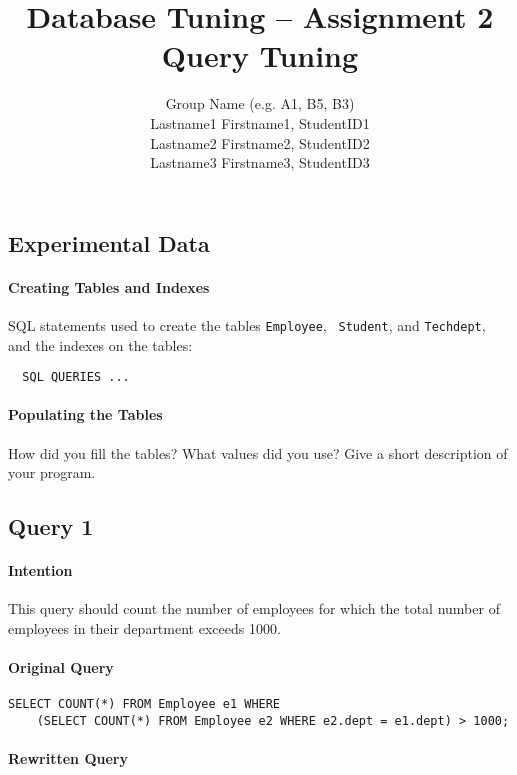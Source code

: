 \documentclass[11pt]{scrartcl}
\title{
  \textbf{\large Database Tuning -- Assignment 2}\\
  Query Tuning
}
\author{
 Group Name (e.g. A1, B5, B3)\\
 \large Lastname1 Firstname1, StudentID1 \\
 \large Lastname2 Firstname2, StudentID2 \\
 \large Lastname3 Firstname3, StudentID3 
}
\begin{document}
\maketitle

\subsection*{Experimental Data}

\paragraph{Creating Tables and Indexes}

SQL statements used to create the tables {\tt Employee}, {\tt
  Student}, and {\tt Techdept}, and the indexes on the tables:

{\small
\begin{verbatim}
  SQL QUERIES ...
\end{verbatim}
}

\paragraph{Populating the Tables}

How did you fill the tables? What values did you use? Give a short
description of your program.

\subsection*{Query 1}

\paragraph{Intention}

This query should count the number of employees for which the total
number of employees in their department exceeds 1000.

\paragraph{Original Query}

{\small
\begin{verbatim}
SELECT COUNT(*) FROM Employee e1 WHERE
    (SELECT COUNT(*) FROM Employee e2 WHERE e2.dept = e1.dept) > 1000;
\end{verbatim}
}

\paragraph{Rewritten Query}
\end{document}
